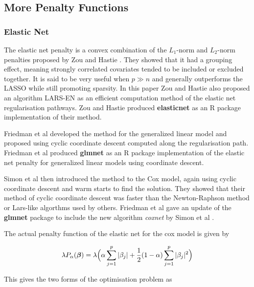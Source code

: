 \subsection{More Penalty Functions}

\subsubsection{Elastic Net}\label{sec:elastic-net}

The elastic net penalty is a convex combination of the $L_1$-norm and $L_2$-norm penalties proposed by Zou and Hastie . They showed that it had a grouping effect, meaning strongly correlated covariates tended to be included or excluded together. It is said to be very useful when $p\gg n$ and generally outperforms the LASSO while still promoting sparsity. In this paper Zou and Hastie  also proposed an algorithm LARS-EN as an efficient computation method of the elastic net regularisation pathways. Zou and Hastie  produced \textbf{elasticnet} as an R package implementation of their method.

Friedman et al  developed the method for the generalized linear model and proposed using cyclic coordinate descent computed along the regularisation path. Friedman et al  produced \textbf{glmnet} as an R package implementation of the elastic net penalty for generalized linear models using coordinate descent.

Simon et al  then introduced the method to the Cox model, again using cyclic coordinate descent and warm starts to find the solution. They showed that their method of cyclic coordinate descent was faster than the Newton-Raphson method or Lars-like algorthms used by others. Friedman et al  gave an update of the \textbf{glmnet} package to include the new algorithm \emph{coxnet} by Simon et al .

The actual penalty function of the elastic net for the cox model is given by

\begin{equation}
    \lambda P_\alpha(\boldsymbol{\beta}) = \lambda\Big(\alpha\sum_{j=1}^p|\beta_j|+\frac{1}{2}(1-\alpha)\sum_{j=1}^p|\beta_j|^2\Big)
\end{equation}

This gives the two forms of the optimisation problem as

